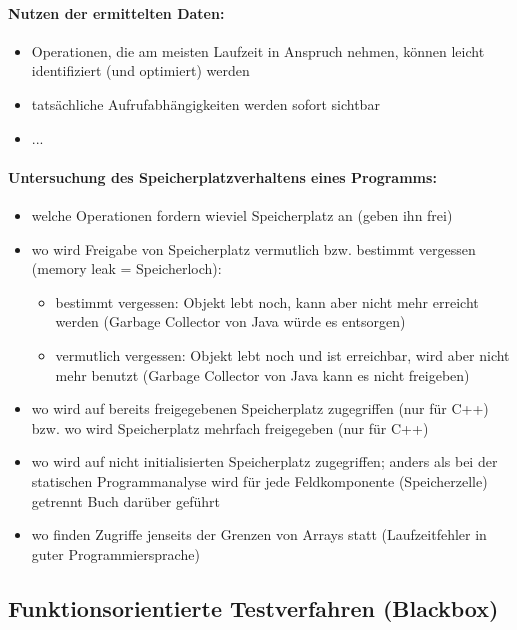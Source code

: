 \paragraph{Nutzen der ermittelten Daten:}
\begin{itemize}
	\item  Operationen, die am meisten Laufzeit in Anspruch nehmen, können leicht identifiziert (und optimiert) werden
	\item tatsächliche Aufrufabhängigkeiten werden sofort sichtbar
	\item ...
\end{itemize}

\paragraph{Untersuchung des Speicherplatzverhaltens eines Programms:}
\begin{itemize}
	\item welche Operationen fordern wieviel Speicherplatz an (geben ihn frei)
	\item wo wird Freigabe von Speicherplatz vermutlich bzw. bestimmt vergessen (memory leak = Speicherloch):
	\begin{itemize}
		\item bestimmt vergessen: Objekt lebt noch, kann aber nicht mehr erreicht werden (Garbage Collector von Java würde es entsorgen)
		\item vermutlich vergessen: Objekt lebt noch und ist erreichbar, wird aber nicht mehr benutzt (Garbage Collector von Java kann es nicht freigeben)
	\end{itemize}
	\item wo wird auf bereits freigegebenen Speicherplatz zugegriffen (nur für C++) bzw. wo wird Speicherplatz mehrfach freigegeben (nur für C++)
	\item wo wird auf nicht initialisierten Speicherplatz zugegriffen; anders als bei der statischen Programmanalyse wird für jede Feldkomponente (Speicherzelle) getrennt Buch darüber geführt 
	\item wo finden Zugriffe jenseits der Grenzen von Arrays statt (Laufzeitfehler in guter Programmiersprache)
\end{itemize}

\subsection{Funktionsorientierte Testverfahren (Blackbox)}

